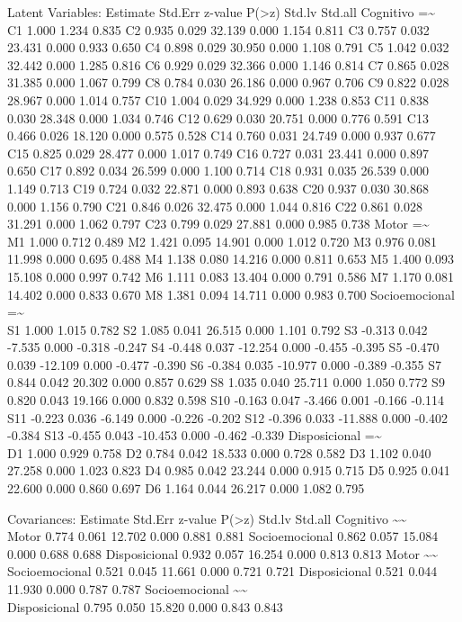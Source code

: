 \documentclass[
]{article}
\begin{document}
Latent Variables: Estimate Std.Err z-value
P(\textgreater\textbar z\textbar) Std.lv Std.all Cognitivo
=\textasciitilde{}\\
C1 1.000 1.234 0.835 C2 0.935 0.029 32.139 0.000 1.154 0.811 C3 0.757
0.032 23.431 0.000 0.933 0.650 C4 0.898 0.029 30.950 0.000 1.108 0.791
C5 1.042 0.032 32.442 0.000 1.285 0.816 C6 0.929 0.029 32.366 0.000
1.146 0.814 C7 0.865 0.028 31.385 0.000 1.067 0.799 C8 0.784 0.030
26.186 0.000 0.967 0.706 C9 0.822 0.028 28.967 0.000 1.014 0.757 C10
1.004 0.029 34.929 0.000 1.238 0.853 C11 0.838 0.030 28.348 0.000 1.034
0.746 C12 0.629 0.030 20.751 0.000 0.776 0.591 C13 0.466 0.026 18.120
0.000 0.575 0.528 C14 0.760 0.031 24.749 0.000 0.937 0.677 C15 0.825
0.029 28.477 0.000 1.017 0.749 C16 0.727 0.031 23.441 0.000 0.897 0.650
C17 0.892 0.034 26.599 0.000 1.100 0.714 C18 0.931 0.035 26.539 0.000
1.149 0.713 C19 0.724 0.032 22.871 0.000 0.893 0.638 C20 0.937 0.030
30.868 0.000 1.156 0.790 C21 0.846 0.026 32.475 0.000 1.044 0.816 C22
0.861 0.028 31.291 0.000 1.062 0.797 C23 0.799 0.029 27.881 0.000 0.985
0.738 Motor =\textasciitilde{}\\
M1 1.000 0.712 0.489 M2 1.421 0.095 14.901 0.000 1.012 0.720 M3 0.976
0.081 11.998 0.000 0.695 0.488 M4 1.138 0.080 14.216 0.000 0.811 0.653
M5 1.400 0.093 15.108 0.000 0.997 0.742 M6 1.111 0.083 13.404 0.000
0.791 0.586 M7 1.170 0.081 14.402 0.000 0.833 0.670 M8 1.381 0.094
14.711 0.000 0.983 0.700 Socioemocional =\textasciitilde{}\\
S1 1.000 1.015 0.782 S2 1.085 0.041 26.515 0.000 1.101 0.792 S3 -0.313
0.042 -7.535 0.000 -0.318 -0.247 S4 -0.448 0.037 -12.254 0.000 -0.455
-0.395 S5 -0.470 0.039 -12.109 0.000 -0.477 -0.390 S6 -0.384 0.035
-10.977 0.000 -0.389 -0.355 S7 0.844 0.042 20.302 0.000 0.857 0.629 S8
1.035 0.040 25.711 0.000 1.050 0.772 S9 0.820 0.043 19.166 0.000 0.832
0.598 S10 -0.163 0.047 -3.466 0.001 -0.166 -0.114 S11 -0.223 0.036
-6.149 0.000 -0.226 -0.202 S12 -0.396 0.033 -11.888 0.000 -0.402 -0.384
S13 -0.455 0.043 -10.453 0.000 -0.462 -0.339 Disposicional
=\textasciitilde{}\\
D1 1.000 0.929 0.758 D2 0.784 0.042 18.533 0.000 0.728 0.582 D3 1.102
0.040 27.258 0.000 1.023 0.823 D4 0.985 0.042 23.244 0.000 0.915 0.715
D5 0.925 0.041 22.600 0.000 0.860 0.697 D6 1.164 0.044 26.217 0.000
1.082 0.795

Covariances: Estimate Std.Err z-value P(\textgreater\textbar z\textbar)
Std.lv Std.all Cognitivo \textasciitilde\textasciitilde{}\\
Motor 0.774 0.061 12.702 0.000 0.881 0.881 Socioemocional 0.862 0.057
15.084 0.000 0.688 0.688 Disposicional 0.932 0.057 16.254 0.000 0.813
0.813 Motor \textasciitilde\textasciitilde{}\\
Socioemocional 0.521 0.045 11.661 0.000 0.721 0.721 Disposicional 0.521
0.044 11.930 0.000 0.787 0.787 Socioemocional
\textasciitilde\textasciitilde{}\\
Disposicional 0.795 0.050 15.820 0.000 0.843 0.843
\end{document}
